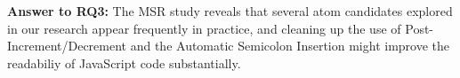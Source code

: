\begin{mh}
  {\bf Answer to RQ3:} The MSR study reveals that
  several atom candidates explored in our research
  appear frequently in practice, and cleaning up the use of 
  Post-Increment/Decrement and the Automatic Semicolon Insertion
  might improve the readabiliy of JavaScript code substantially. 
\end{mh}






